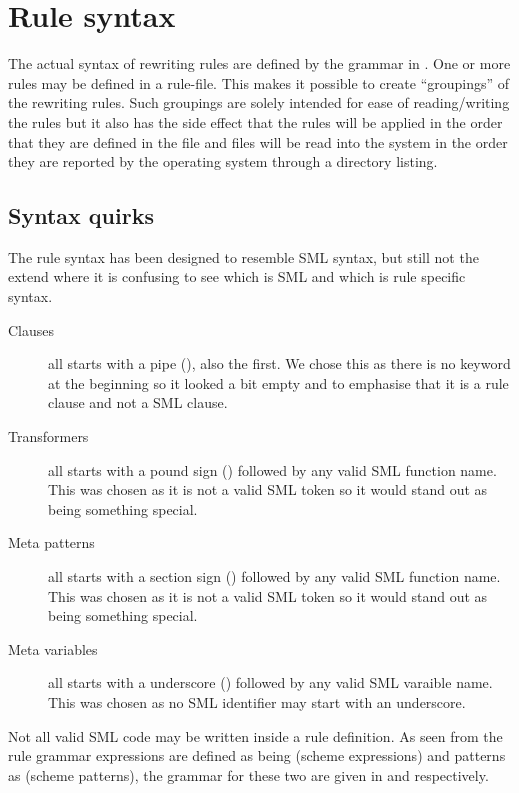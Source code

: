 \section{Rule syntax}\label{sec:rule-syntax}
The actual syntax of rewriting rules are defined by the grammar in
. One or more rules may be defined in a rule-file. This
makes it possible to create ``groupings'' of the rewriting rules. Such groupings
are solely intended for ease of reading/writing the rules but it also has the
side effect that the rules will be applied in the order that they are defined in
the file and files will be read into the system in the order they are reported
by the operating system through a directory listing.

\subsection{Syntax quirks}

The rule syntax has been designed to resemble SML syntax, but still not the
extend where it is confusing to see which is SML and which is rule specific
syntax.

\begin{description}
\item[Clauses] all starts with a pipe (\ttt{|}), also the first. We chose this as
  there is no  keyword at the beginning so it looked a bit empty and to
  emphasise that it is a rule clause and not a SML clause.

\item[Transformers] all starts with a pound sign () followed by any valid
  SML function name. This was chosen as it is not a valid SML token so it would
  stand out as being something special.

\item[Meta patterns] all starts with a section sign () followed by any
  valid SML function name. This was chosen as it is not a valid SML token so it
  would stand out as being something special.

\item[Meta variables] all starts with a underscore (\ttt{\_}) followed by any
  valid SML varaible name. This was chosen as no SML identifier may start with
  an underscore.
\end{description}

Not all valid SML code may be written inside a rule definition. As seen from the
rule grammar expressions are defined as being  (scheme expressions)
and patterns as  (scheme patterns), the grammar for these two are
given in  and 
respectively.






